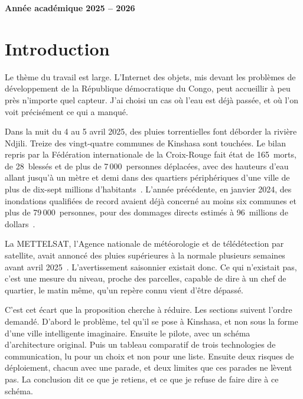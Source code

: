 \documentclass[12pt,a4paper]{article}
\begin{document}
\begin{titlepage}
\vfill
{\Large\sffamily\bfseries Année académique 2025 -- 2026\par}
\vspace{0.8cm}
\end{titlepage}

\hypersetup{pageanchor=true}
\tableofcontents
\clearpage

\section{Introduction}

Le thème du travail est large. L'Internet des objets, mis devant les problèmes de développement de la République démocratique du Congo, peut accueillir à peu près n'importe quel capteur. J'ai choisi un cas où l'eau est déjà passée, et où l'on voit précisément ce qui a manqué.

Dans la nuit du 4 au 5 avril 2025, des pluies torrentielles font déborder la rivière Ndjili. Treize des vingt-quatre communes de Kinshasa sont touchées. Le bilan repris par la Fédération internationale de la Croix-Rouge fait état de 165~morts, de 28~blessés et de plus de 7\,000~personnes déplacées, avec des hauteurs d'eau allant jusqu'à un mètre et demi dans des quartiers périphériques d'une ville de plus de dix-sept millions d'habitants~\cite{ifrc2025}. L'année précédente, en janvier 2024, des inondations qualifiées de record avaient déjà concerné au moins six communes et plus de 79\,000~personnes, pour des dommages directs estimés à 96~millions de dollars~\cite{priur2026}.

La METTELSAT, l'Agence nationale de météorologie et de télédétection par satellite, avait annoncé des pluies supérieures à la normale plusieurs semaines avant avril 2025~\cite{ifrc2025}. L'avertissement saisonnier existait donc. Ce qui n'existait pas, c'est une mesure du niveau, proche des parcelles, capable de dire à un chef de quartier, le matin même, qu'un repère connu vient d'être dépassé.

C'est cet écart que la proposition cherche à réduire. Les sections suivent l'ordre demandé. D'abord le problème, tel qu'il se pose à Kinshasa, et non sous la forme d'une ville intelligente imaginaire. Ensuite le pilote, avec un schéma d'architecture original. Puis un tableau comparatif de trois technologies de communication, lu pour un choix et non pour une liste. Ensuite deux risques de déploiement, chacun avec une parade, et deux limites que ces parades ne lèvent pas. La conclusion dit ce que je retiens, et ce que je refuse de faire dire à ce schéma.
\end{document}
